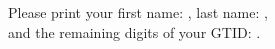 \documentclass[12pt]{exam}
\begin{document}
    
\vspace*{-1cm}

\begin{center}
{\Large \TestName}
\end{center}
\newcommand{\ID}{Please print your first name: \framebox{\strut\hspace{4.2cm}}, last name: \framebox{\strut\hspace{4.2cm}}, \\[2pt] and the remaining digits of your GTID:  \framebox{\strut $9$}\framebox{\strut $0$}\framebox{\strut\hspace{0.19cm}}\framebox{\strut\hspace{0.19cm}}\framebox{\strut\hspace{0.19cm}}\framebox{\strut\hspace{0.19cm}}\framebox{\strut\hspace{0.19cm}}\framebox{\strut\hspace{0.19cm}}\framebox{\strut\hspace{0.19cm}}.}

\ID
\end{document}
